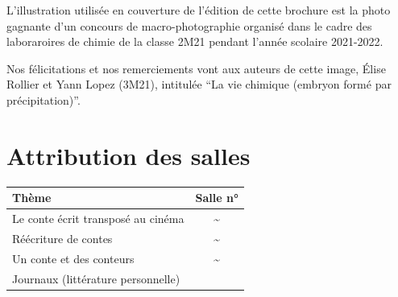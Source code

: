 \documentclass[
  10pt,
  french,
  a5paper,
  openany]{book}
\begin{document}
L'illustration utilisée en couverture de l'édition de cette brochure est la photo gagnante d'un concours de macro-photographie organisé dans le cadre des laboraroires de chimie de la classe 2M21 pendant l'année scolaire 2021-2022.

Nos félicitations et nos remerciements vont aux auteurs de cette image, Élise Rollier et Yann Lopez (3M21), intitulée ``La vie chimique (embryon formé par précipitation)''.

\hypertarget{attribution-des-salles}{%
\chapter*{Attribution des salles}\label{attribution-des-salles}}

\begin{longtable}[]{@{}lc@{}}
\toprule
\begin{minipage}[b]{0.88\columnwidth}\raggedright
Thème\strut
\end{minipage} & \begin{minipage}[b]{0.06\columnwidth}\centering
Salle n°\strut
\end{minipage}\tabularnewline
\midrule
\endhead
\begin{minipage}[t]{0.88\columnwidth}\raggedright
Le conte écrit transposé au cinéma\strut
\end{minipage} & \begin{minipage}[t]{0.06\columnwidth}\centering
\textasciitilde{}\strut
\end{minipage}\tabularnewline
\begin{minipage}[t]{0.88\columnwidth}\raggedright
Réécriture de contes\strut
\end{minipage} & \begin{minipage}[t]{0.06\columnwidth}\centering
\textasciitilde{}\strut
\end{minipage}\tabularnewline
\begin{minipage}[t]{0.88\columnwidth}\raggedright
Un conte et des conteurs\strut
\end{minipage} & \begin{minipage}[t]{0.06\columnwidth}\centering
\textasciitilde{}\strut
\end{minipage}\tabularnewline
\begin{minipage}[t]{0.88\columnwidth}\raggedright
Journaux (littérature personnelle)\strut
\end{minipage} & \begin{minipage}[t]{0.06\columnwidth}\centering

\end{minipage}
\end{longtable}
\end{document}
